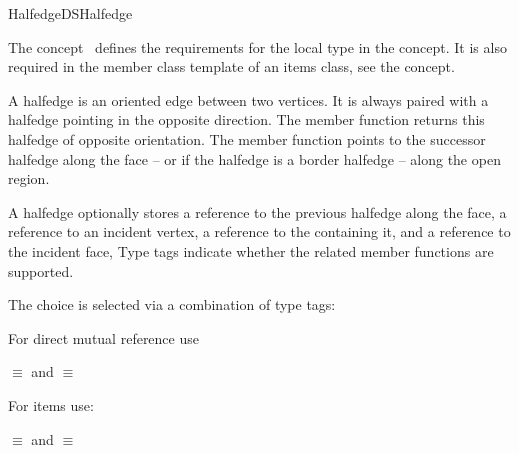 
\ccRefPageBegin



\begin{ccRefConcept}{HalfedgeDSHalfedge}
\label{pageHalfedgeDSItemsHalfedgeRef}

\ccDefinition
  
The concept \ccRefName\ defines the requirements for the local  
type in the  concept. It is also required in 
the  member class template of an
items class, see the  concept.

A halfedge is an oriented edge between two vertices. It is always
paired with a halfedge pointing in the opposite direction. The
 member function returns this halfedge of opposite
orientation. The  member function points to the successor
halfedge along the face -- or if the halfedge is a border halfedge --
along the open region. 

A halfedge optionally stores a reference to the
previous halfedge along the face, a reference to an incident vertex,
{\XHDS a reference to the  containing it},
and a reference to the incident face,
Type tags indicate whether the related member functions are supported.

{\XHDS



The choice is selected via a combination of type tags:

For direct mutual reference use

 $\equiv$  
and
 $\equiv$  

For  items use:

 $\equiv$  
and
 $\equiv$  
 
}
\end{ccRefConcept}
